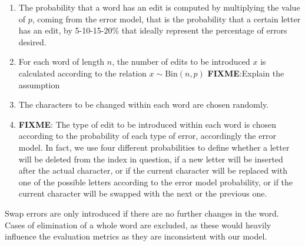 \begin{enumerate}
	\item The probability that a word has an edit is computed by multiplying the value of $p$, coming from the 
	error model, that is the probability that a certain letter has an edit, by 
	\num{5}-\num{10}-\num{15}-\num{20}\% that ideally represent the percentage of errors desired.
	\item For each word of length $n$, the number of edits to be introduced $x$ is calculated according to the 
	relation $x \sim \text{Bin}(n, p)$ \textbf{FIXME}:{Explain the assumption}
	\item The characters to be changed within each word are chosen randomly.
	\item \textbf{FIXME}: The type of edit to be introduced within each word is chosen according to the 
	probability of each type of error, accordingly the error model. 
	In fact, we use four different probabilities to define whether a letter will be deleted from the index in question, 
	if a new letter will be inserted after the actual character, or if the current character will be replaced with one of 
	the possible letters according to the error model probability, or if the current character will be swapped with 
	the next or the previous one.
	
\end{enumerate}

Swap errors are only introduced if there are no further changes in the word. Cases of elimination of a whole 
word are excluded, as these would heavily influence the evaluation metrics as they are inconsistent with our 
model. 



